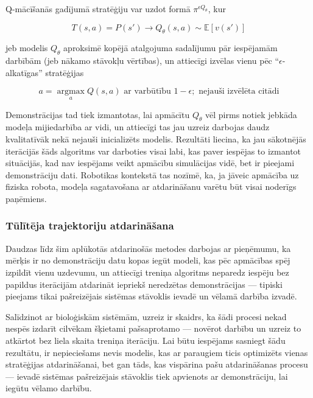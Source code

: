 \documentclass[12pt, a4paper]{article}
\numberwithin{equation}{section} %
\begin{document}
Q-mācīšanās gadījumā stratēģiju var uzdot formā $\pi^{\epsilon Q_{\theta}}$, kur

\begin{equation}
    T(s,a) = P(s') \rightarrow Q_{\theta}(s,a) \sim \mathbb{E}[v(s')] 
\end{equation}

jeb modelis $Q_{\theta}$ aproksimē kopējā atalgojuma sadalījumu pār iespējamām darbībām (jeb nākamo stāvokļu vērtības), un attiecīgi izvēlas vienu pēc ``$\epsilon$-alkatīgas'' stratēģijas

\begin{equation}
    a = \operatorname*{argmax}_a Q(s,a) \text{ ar varbūtību } 1-\epsilon; \text{ nejauši izvēlēta citādi}
\end{equation}

Demonstrācijas tad tiek izmantotas, lai apmācītu $Q_{\theta}$ vēl pirms notiek jebkāda modeļa mijiedarbība ar vidi, un attiecīgi tas jau uzreiz darbojas daudz kvalitatīvāk nekā nejauši inicializēts modelis. Rezultāti liecina, ka jau sākotnējās iterācijās šāds algoritms var darboties visai labi, kas paver iespējas to izmantot situācijās, kad nav iespējams veikt apmācību simulācijas vidē, bet ir pieejami demonstrāciju dati. Robotikas kontekstā tas nozīmē, ka, ja jāveic apmācība uz fiziska robota, modeļa sagatavošana ar atdarināšanu varētu būt visai noderīgs paņēmiens.


\subsubsection{Tūlītēja trajektoriju atdarināšana}

Daudzas līdz šim aplūkotās atdarinošās metodes darbojas ar pieņēmumu, ka mērķis ir no demonstrāciju datu kopas iegūt modeli, kas pēc apmācības spēj izpildīt vienu uzdevumu, un attiecīgi treniņa algoritms neparedz iespēju bez papildus iterācijām atdarināt iepriekš neredzētas demonstrācijas --- tipiski pieejams tikai pašreizējais sistēmas stāvoklis ievadē un vēlamā darbība izvadē.

Salīdzinot ar bioloģiskām sistēmām, uzreiz ir skaidrs, ka šādi procesi nekad nespēs izdarīt cilvēkam šķietami pašsaprotamo --- novērot darbību un uzreiz to atkārtot bez liela skaita treniņa iterāciju. Lai būtu iespējams sasniegt šādu rezultātu, ir nepieciešams nevis modelis, kas ar paraugiem ticis optimizēts vienas stratēģijas atdarināšanai, bet gan tāds, kas vispārina pašu atdarināšanas procesu --- ievadē sistēmas pašreizējais stāvoklis tiek apvienots ar demonstrāciju, lai iegūtu vēlamo darbību. 
\end{document}
